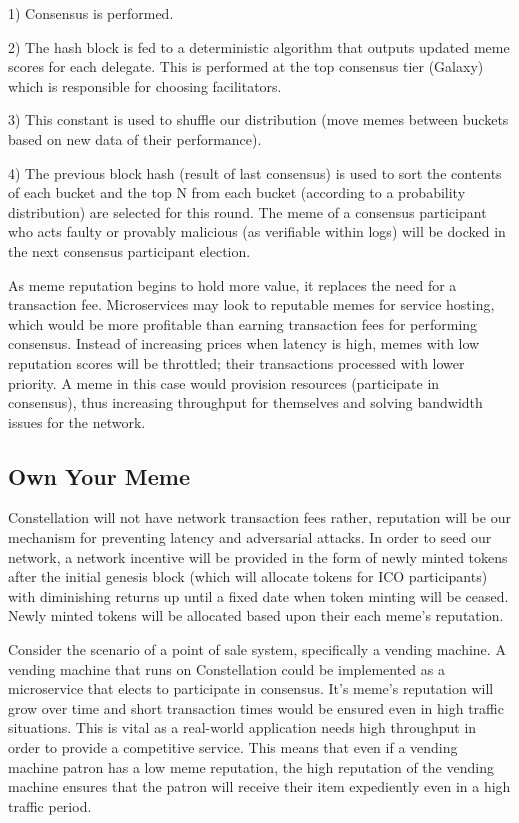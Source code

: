 \documentclass{article}
\begin{document}
1)	Consensus is performed.

2)	The hash block is fed to a deterministic algorithm that outputs updated meme scores for each delegate. This is performed at the top consensus tier (Galaxy) which is responsible for choosing facilitators.

3)	This constant is used to shuffle our distribution (move memes between buckets based on new data of their performance).

4)	The previous block hash (result of last consensus) is used to sort the contents of each bucket and the top N from each bucket (according to a probability distribution) are selected for this round. The meme of a consensus participant who acts faulty or provably malicious (as verifiable within logs) will be docked in the next consensus participant election.

As meme reputation begins to hold more value, it replaces the need for a transaction fee. Microservices may look to reputable memes for service hosting, which would be more profitable than earning transaction fees for performing consensus. Instead of increasing prices when latency is high, memes with low reputation scores will be throttled; their transactions processed with lower priority. A meme in this case would provision resources (participate in consensus), thus increasing throughput for themselves and solving bandwidth issues for the network.

\subsection{Own Your Meme}
Constellation will not have network transaction fees rather, reputation will be our mechanism for preventing latency and adversarial attacks. In order to seed our network, a network incentive will be provided in the form of newly minted tokens after the initial genesis block (which will allocate tokens for ICO participants) with diminishing returns up until a fixed date when token minting will be ceased. Newly minted tokens will be allocated based upon their each meme's reputation.

Consider the scenario of a point of sale system, specifically a vending machine. A vending machine that runs on Constellation could be implemented as a microservice that elects to participate in consensus. It's meme's reputation will grow over time and short transaction times would be ensured even in high traffic situations. This is vital as a real-world application needs high throughput in order to provide a competitive service. This means that even if a vending machine patron has a low meme reputation, the high reputation of the vending machine ensures that the patron will receive their item expediently even in a high traffic period. 
\end{document}
